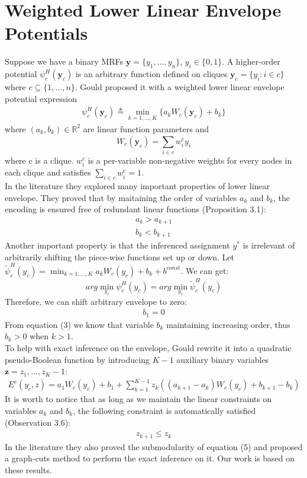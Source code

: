 \documentclass{article}
\begin{document}
		\section{Weighted Lower Linear Envelope Potentials}
		Suppose we have a binary MRFs $\mathbf{y}=\{y_1,\dots,y_n\}$, $y_i\in\{0,1\}$. A higher-order potential $\psi_c^H(\mathbf{y}_c)$ is an arbitrary function defined on cliques $\mathbf{y}_c=\{y_i : i\in c\}$ where $c\subseteq\{1,\dots,n\}$. Gould\cite{gouldlearning} proposed it with a weighted lower linear envelope potential expression
		\begin{align}
		\psi_c^H(\mathbf{y}_c) \triangleq \min_{k=1,\dots,K}\bigg\{a_kW_c(\mathbf{y}_c)+b_k\bigg\}
		\end{align}
		where $(a_k,b_k)\in\mathbb{R}^2$ are linear function parameters and
		$$
		W_c(\mathbf{y}_c) = \sum_{i\in c}^{}w_i^cy_i
		$$
		where c is a clique. $w_i^c$ is a per-variable non-negative weights for every nodes in each clique and satisfies $\sum_ {i\in c}^{}w_i^c=1$.\\
		In the literature they explored many important properties of lower linear envelope. They proved that by maitaining the order of variables $a_k$ and $b_k$, the encoding is ensured free of redundant linear functions (Proposition 3.1\cite{gouldlearning}):
		\begin{align}
		a_k > a_{k+1}\\
		b_k < b_{k+1}
		\end{align}
		Another important property is that the inferenced assignment $y^*$ is irrelevant of arbitrarily shifting the piece-wise functions set up or down. Let $ \tilde{\psi}_c^H(y_c) = \min_{k=1,\dots,K}{a_kW_c(y_c)+b_k+b^{const}}$. We can get:
		$$
		arg\min_{y_c}{\psi_c^H(y_c)}=arg\min_{y_c}{\tilde{\psi}_c^H(y_c)}
		$$
		Therefore, we can shift arbitrary envelope to zero:
		\begin{align}
		b_1 = 0
		\end{align}
		From equation (3) we know that variable $b_k$ maintaining increasing order, thus $b_k>0$ when $k>1$.\\
		To help with exact inference on the envelope, Gould\cite{gouldlearning} rewrite it into a quadratic pseudo-Boolean function by introducing $K-1$ auxiliary binary variables $\mathbf{z} = {z_1,\dots,z_K-1}$:
		\begin{align}
		E^c(y_c,z)=a_1W_c(y_c)+b_1+\sum_{k=1}^{K-1}z_k((a_{k+1}-a_k)W_c(y_c)+b_{k+1}-b_k)
		\end{align}
		It is worth to notice that as long as we maintain the linear constraints on variables $a_k$ and $b_k$, the following constraint is automatically satisfied (Observation 3.6\cite{gouldlearning}):
		\begin{align}
		z_{k+1}\le z_k
		\end{align}
		In the literature they also proved the submodularity of equation (5) and proposed a graph-cuts method to perform the exact inference on it. Our work is based on these results.
		
\end{document}
